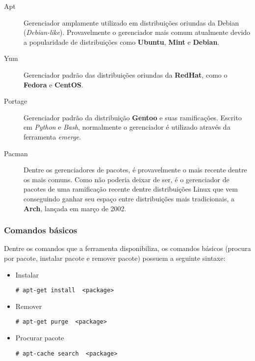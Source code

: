 \begin{description}
	\item [Apt] Gerenciador amplamente utilizado em distribuições oriundas da Debian (\textit{Debian-like}). Provavelmente o gerenciador mais comum atualmente devido a popularidade de distribuições como \textbf{Ubuntu}, \textbf{Mint} e \textbf{Debian}.
	\item [Yum] Gerenciador padrão  das distribuições oriundas da \textbf{RedHat}, como o \textbf{Fedora} e \textbf{CentOS}.
	\item [Portage] Gerenciador padrão da distribuição \textbf{Gentoo} e suas ramificações. Escrito em \textit{Python} e \textit{Bash}, normalmente o gerenciador é utilizado através da ferramenta \textit{emerge}.
	\item [Pacman] Dentre os gerenciadores de pacotes, é provavelmente o mais recente dentre os mais comuns. Como não poderia deixar de ser, é  o gerenciador de pacotes de uma ramificação recente dentre distribuições Linux que vem conseguindo ganhar seu espaço entre distribuições mais tradicionais, a \textbf{Arch}, lançada em março de 2002.
\end{description}


\subsubsection{Comandos básicos} %
\label{sub:apt}

Dentre os comandos que a ferramenta disponibiliza, os comandos básicos (procura por pacote, instalar pacote e remover pacote) possuem a seguinte sintaxe:

\begin{itemize}
	\item Instalar
	\begin{lstlisting}[numbers=none,commentstyle=\color{black}]
	# apt-get install  <package>
	\end{lstlisting}
	\item Remover
	\begin{lstlisting}[numbers=none,commentstyle=\color{black}]
	# apt-get purge  <package>
	\end{lstlisting}
	\item Procurar pacote
	\begin{lstlisting}[numbers=none,commentstyle=\color{black}]
	# apt-cache search  <package>
	\end{lstlisting}
\end{itemize}



